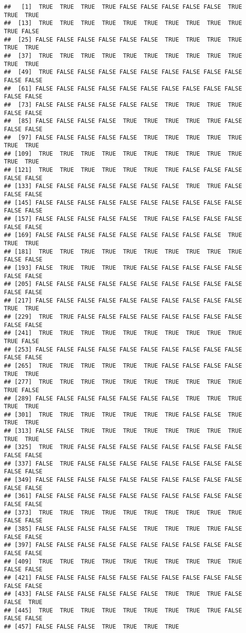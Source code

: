 \documentclass[
]{article}
\begin{document}
\begin{verbatim}
##   [1]  TRUE  TRUE  TRUE  TRUE FALSE FALSE FALSE FALSE FALSE  TRUE  TRUE  TRUE
##  [13]  TRUE  TRUE  TRUE  TRUE  TRUE  TRUE  TRUE  TRUE  TRUE  TRUE  TRUE FALSE
##  [25] FALSE FALSE FALSE FALSE FALSE FALSE  TRUE  TRUE  TRUE  TRUE  TRUE  TRUE
##  [37]  TRUE  TRUE  TRUE  TRUE  TRUE  TRUE  TRUE  TRUE  TRUE  TRUE  TRUE  TRUE
##  [49]  TRUE FALSE FALSE FALSE FALSE FALSE FALSE FALSE FALSE FALSE FALSE FALSE
##  [61] FALSE FALSE FALSE FALSE FALSE FALSE FALSE FALSE FALSE FALSE FALSE FALSE
##  [73] FALSE FALSE FALSE FALSE FALSE FALSE  TRUE  TRUE  TRUE  TRUE FALSE FALSE
##  [85] FALSE FALSE FALSE FALSE  TRUE  TRUE  TRUE  TRUE  TRUE FALSE FALSE FALSE
##  [97] FALSE FALSE FALSE FALSE FALSE  TRUE  TRUE  TRUE  TRUE  TRUE  TRUE  TRUE
## [109]  TRUE  TRUE  TRUE  TRUE  TRUE  TRUE  TRUE  TRUE  TRUE  TRUE  TRUE  TRUE
## [121]  TRUE  TRUE  TRUE  TRUE  TRUE  TRUE  TRUE FALSE FALSE FALSE FALSE FALSE
## [133] FALSE FALSE FALSE FALSE FALSE FALSE FALSE  TRUE  TRUE FALSE FALSE FALSE
## [145] FALSE FALSE FALSE FALSE FALSE FALSE FALSE FALSE FALSE FALSE FALSE FALSE
## [157] FALSE FALSE FALSE FALSE FALSE  TRUE FALSE FALSE FALSE FALSE FALSE FALSE
## [169] FALSE FALSE FALSE FALSE FALSE FALSE FALSE FALSE FALSE  TRUE  TRUE  TRUE
## [181]  TRUE  TRUE  TRUE  TRUE  TRUE  TRUE  TRUE  TRUE  TRUE  TRUE FALSE FALSE
## [193] FALSE  TRUE  TRUE  TRUE  TRUE FALSE FALSE FALSE FALSE FALSE FALSE FALSE
## [205] FALSE FALSE FALSE FALSE FALSE FALSE FALSE FALSE FALSE FALSE FALSE FALSE
## [217] FALSE FALSE FALSE FALSE FALSE FALSE FALSE FALSE FALSE FALSE  TRUE  TRUE
## [229]  TRUE  TRUE FALSE FALSE FALSE FALSE FALSE FALSE FALSE FALSE FALSE FALSE
## [241]  TRUE  TRUE  TRUE  TRUE  TRUE  TRUE  TRUE  TRUE  TRUE  TRUE  TRUE FALSE
## [253] FALSE FALSE FALSE FALSE FALSE FALSE FALSE FALSE FALSE FALSE FALSE FALSE
## [265]  TRUE  TRUE  TRUE  TRUE  TRUE  TRUE FALSE FALSE FALSE FALSE  TRUE  TRUE
## [277]  TRUE  TRUE  TRUE  TRUE  TRUE  TRUE  TRUE  TRUE  TRUE  TRUE  TRUE FALSE
## [289] FALSE FALSE FALSE FALSE FALSE FALSE FALSE  TRUE  TRUE  TRUE  TRUE  TRUE
## [301]  TRUE  TRUE  TRUE  TRUE  TRUE  TRUE  TRUE FALSE FALSE  TRUE  TRUE  TRUE
## [313] FALSE FALSE  TRUE  TRUE  TRUE  TRUE  TRUE  TRUE  TRUE  TRUE  TRUE  TRUE
## [325]  TRUE  TRUE FALSE FALSE FALSE FALSE FALSE FALSE FALSE FALSE FALSE FALSE
## [337] FALSE  TRUE FALSE FALSE FALSE FALSE FALSE FALSE FALSE FALSE FALSE FALSE
## [349] FALSE FALSE FALSE FALSE FALSE FALSE FALSE FALSE FALSE FALSE FALSE FALSE
## [361] FALSE FALSE FALSE FALSE FALSE FALSE FALSE FALSE FALSE FALSE FALSE FALSE
## [373]  TRUE  TRUE  TRUE  TRUE  TRUE  TRUE  TRUE  TRUE  TRUE  TRUE FALSE FALSE
## [385] FALSE FALSE FALSE FALSE FALSE  TRUE  TRUE  TRUE  TRUE FALSE FALSE FALSE
## [397] FALSE FALSE FALSE FALSE FALSE FALSE FALSE FALSE FALSE FALSE FALSE FALSE
## [409]  TRUE  TRUE  TRUE  TRUE  TRUE  TRUE  TRUE  TRUE  TRUE  TRUE FALSE FALSE
## [421] FALSE FALSE FALSE FALSE FALSE FALSE FALSE FALSE FALSE FALSE FALSE FALSE
## [433] FALSE FALSE FALSE FALSE FALSE FALSE  TRUE  TRUE  TRUE FALSE FALSE  TRUE
## [445]  TRUE  TRUE  TRUE  TRUE  TRUE  TRUE  TRUE  TRUE  TRUE FALSE FALSE FALSE
## [457] FALSE FALSE FALSE  TRUE  TRUE  TRUE  TRUE
\end{verbatim}
\end{document}
